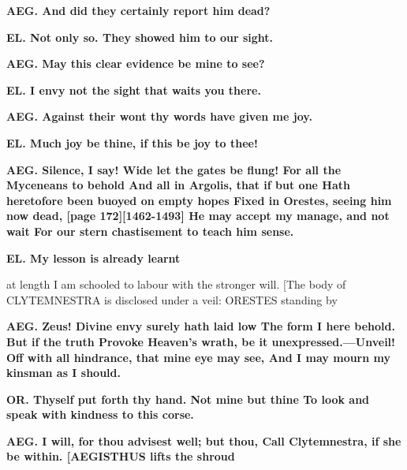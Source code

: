 \documentclass[11pt,letter]{book}
\begin{document}
\par \textbf{AEG. And did they certainly report him dead?}
\par 

\par \textbf{EL. Not only so. They showed him to our sight.}
\par 

\par \textbf{AEG. May this clear evidence be mine to see?}
\par 

\par \textbf{EL. I envy not the sight that waits you there.}
\par 

\par \textbf{AEG. Against their wont thy words have given me joy.}
\par 

\par \textbf{EL. Much joy be thine, if this be joy to thee!}
\par 

\par \textbf{AEG. Silence, I say! Wide let the gates be flung! For all the Myceneans to behold And all in Argolis, that if but one Hath heretofore been buoyed on empty hopes Fixed in Orestes, seeing him now dead, [page 172][1462-1493] He may accept my manage, and not wait For our stern chastisement to teach him sense.}
\par 

\par \textbf{EL. My lesson is already learnt}
\par   at length I am schooled to labour with the stronger will. [The body of CLYTEMNESTRA is disclosed under a veil:  ORESTES standing by

\par \textbf{AEG. Zeus! Divine envy surely hath laid low The form I here behold. But if the truth Provoke Heaven’s wrath, be it unexpressed.—Unveil! Off with all hindrance, that mine eye may see, And I may mourn my kinsman as I should.}
\par 

\par \textbf{OR. Thyself put forth thy hand. Not mine but thine To look and speak with kindness to this corse.}
\par 

\par \textbf{AEG. I will, for thou advisest well; but thou, Call Clytemnestra, if she be within. [AEGISTHUS lifts the shroud}
\par 
\end{document}
